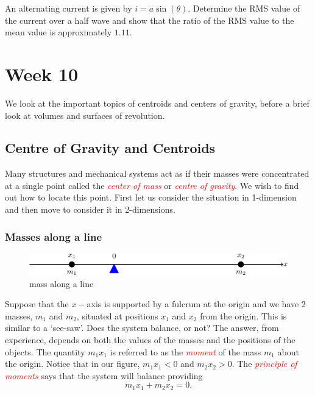 \documentclass[
  11pt,
  oneside]{book}
\newcommand{\slide}{}
\theoremstyle{definition}
\theoremstyle{definition}
\theoremstyle{definition}
\theoremstyle{definition}
\theoremstyle{remark}
\begin{document}
An alternating current is given by \(i = a\sin(\theta)\). Determine the RMS value of the current over a half wave and show that the ratio of the RMS value to the mean value is approximately \(1.11\).

\chapter{Week 10}\label{week-ten}

We look at the important topics of centroids and centers of gravity, before a brief look at volumes and surfaces of revolution.

\slide

\section{Centre of Gravity and Centroids}\label{centre-of-gravity-and-centroids}

Many structures and mechanical systems act as if their masses were concentrated at a single point called the \textcolor{red}{\em center of mass} or \textcolor{red}{\em centre of gravity}. We wish to find out how to locate this point. First let us consider the situation in 1-dimension and then move to consider it in 2-dimensions.

\slide

\subsection{Masses along a line}\label{masses-along-a-line}

\begin{figure}

{\centering \includegraphics[width=0.6\linewidth]{tikztopng-figure34} 

}

\caption{mass along a line}\label{fig:unnamed-chunk-67}
\end{figure}

Suppose that the \(x-\)axis is supported by a fulcrum at the origin and we have 2 masses, \(m_1\) and \(m_2\), situated at positions \(x_1\) and \(x_2\) from the origin. This is similar to a `see-saw'. Does the system balance, or not? The answer, from experience, depends on both the values of the masses and the positions of the objects. The quantity \(m_1x_1\) is referred to as the \textcolor{red}{\em moment} of the mass \(m_1\) about the origin. Notice that in our figure, \(m_1x_1<0\) and \(m_2x_2>0\). The \textcolor{red}{\em principle of moments} says that the system will balance providing
\[
m_1x_1 + m_2x_2 = 0.
\]
\end{document}
